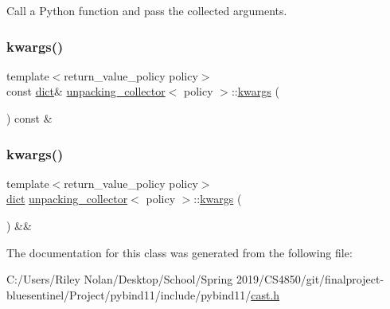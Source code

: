 Call a Python function and pass the collected arguments. 

\mbox{\label{classunpacking__collector_a14ceb5d3912c58d37b244dd5b7824aad}} 
\subsubsection{\texorpdfstring{kwargs()}{kwargs()}\hspace{0.1cm}{\footnotesize\ttfamily [1/2]}}
{\footnotesize\ttfamily template$<$return\+\_\+value\+\_\+policy policy$>$ \\
const \mbox{\hyperlink{classdict}{dict}}\& \mbox{\hyperlink{classunpacking__collector}{unpacking\+\_\+collector}}$<$ policy $>$\+::\mbox{\hyperlink{classkwargs}{kwargs}} (\begin{DoxyParamCaption}{ }\end{DoxyParamCaption}) const \&\hspace{0.3cm}{\ttfamily [inline]}}

\mbox{\label{classunpacking__collector_ad623100e5a5b6ce8adb01dc8d86e5655}} 
\subsubsection{\texorpdfstring{kwargs()}{kwargs()}\hspace{0.1cm}{\footnotesize\ttfamily [2/2]}}
{\footnotesize\ttfamily template$<$return\+\_\+value\+\_\+policy policy$>$ \\
\mbox{\hyperlink{classdict}{dict}} \mbox{\hyperlink{classunpacking__collector}{unpacking\+\_\+collector}}$<$ policy $>$\+::\mbox{\hyperlink{classkwargs}{kwargs}} (\begin{DoxyParamCaption}{ }\end{DoxyParamCaption}) \&\&\hspace{0.3cm}{\ttfamily [inline]}}



The documentation for this class was generated from the following file\+:\begin{DoxyCompactItemize}
\item 
C\+:/\+Users/\+Riley Nolan/\+Desktop/\+School/\+Spring 2019/\+C\+S4850/git/finalproject-\/bluesentinel/\+Project/pybind11/include/pybind11/\mbox{\hyperlink{cast_8h}{cast.\+h}}\end{DoxyCompactItemize}
